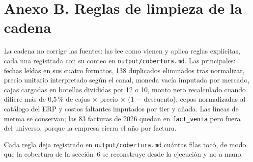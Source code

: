 
\section*{Anexo B. Reglas de limpieza de la cadena}

La cadena no corrige las fuentes: las lee como vienen y aplica reglas explícitas, cada una registrada con su conteo en \texttt{output/cobertura.md}. Las principales: fechas leídas en sus cuatro formatos, 138 duplicados eliminados tras normalizar, precio unitario interpretado según el canal, moneda vacía imputada por mercado, cajas cargadas en botellas divididas por 12 o 10, monto neto recalculado cuando difiere más de 0,5\,\% de cajas $\times$ precio $\times$ (1 $-$ descuento), cepas normalizadas al catálogo del ERP y costos faltantes imputados por tier y añada. Las líneas de merma se conservan; las 83 facturas de 2026 quedan en \texttt{fact\_venta} pero fuera del universo, porque la empresa cierra el año por factura.

Cada regla deja registrado en \texttt{output/cobertura.md} cuántas filas tocó, de modo que la cobertura de la sección~6 se reconstruye desde la ejecución y no a mano.
